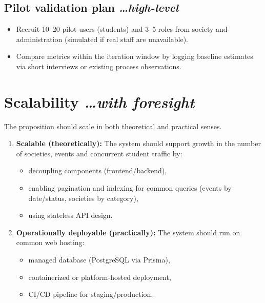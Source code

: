 \documentclass[11pt,a4paper]{article}
\newcommand{\BvrHint}[1]{%
  {\normalfont\normalsize\itshape\hfill #1}}
\begin{document}
\subsection{Pilot validation plan %
\BvrHint{\ldots high-level}}
\begin{itemize}[leftmargin=0.7cm]
    \item Recruit 10--20 pilot users (students) and 3--5
      roles from society and administration (simulated if
      real staff are unavailable).
    \item Compare metrics within the iteration window by
      logging baseline estimates via short interviews or
      existing process observations.
\end{itemize}

\section{Scalability %
\BvrHint{\ldots with foresight}}
The proposition should scale in both theoretical and
practical senses.

\begin{enumerate}[leftmargin=0.7cm]
    \item \textbf{Scalable (theoretically):} The system
      should support growth in the number of societies,
      events and concurrent student traffic by:
    \begin{itemize}[leftmargin=0.7cm]
        \item decoupling components (frontend/backend),
        \item enabling pagination and indexing for common
          queries (events by date/status, societies by
          category),
        \item using stateless API design.
    \end{itemize}

    \item \textbf{Operationally deployable (practically):}
      The system should run on common web hosting:
    \begin{itemize}[leftmargin=0.7cm]
        \item managed database (PostgreSQL via Prisma),
        \item containerized or platform-hosted
          deployment,
        \item CI/CD pipeline for staging/production.
    \end{itemize}
\end{enumerate}
\end{document}
